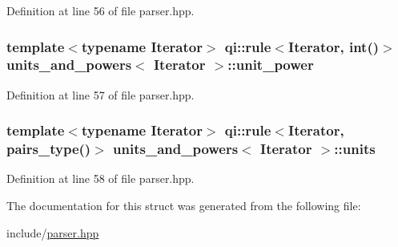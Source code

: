 Definition at line 56 of file parser.\+hpp.

\subsubsection[{\texorpdfstring{unit\+\_\+power}{unit_power}}]{\setlength{\rightskip}{0pt plus 5cm}template$<$typename Iterator$>$ qi\+::rule$<$Iterator, int()$>$ {\bf units\+\_\+and\+\_\+powers}$<$ Iterator $>$\+::unit\+\_\+power}\hypertarget{structunits__and__powers_a90d733fe21d7d5efc2a599b0ab6df131}{}\label{structunits__and__powers_a90d733fe21d7d5efc2a599b0ab6df131}


Definition at line 57 of file parser.\+hpp.

\subsubsection[{\texorpdfstring{units}{units}}]{\setlength{\rightskip}{0pt plus 5cm}template$<$typename Iterator$>$ qi\+::rule$<$Iterator, {\bf pairs\+\_\+type}()$>$ {\bf units\+\_\+and\+\_\+powers}$<$ Iterator $>$\+::units}\hypertarget{structunits__and__powers_ab2d482b29c10f220fbbb3bbaf79d63ef}{}\label{structunits__and__powers_ab2d482b29c10f220fbbb3bbaf79d63ef}


Definition at line 58 of file parser.\+hpp.



The documentation for this struct was generated from the following file\+:\begin{DoxyCompactItemize}
\item 
include/\hyperlink{parser_8hpp}{parser.\+hpp}\end{DoxyCompactItemize}
